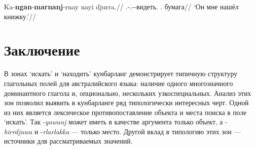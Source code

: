 \begingl
\gla Ka-\textbf{ngan}-\textbf{marnanj}-rnay nayi djurra.//
\glb \Tsg.\Real-\Fsg.\Obj-\Ben-видеть.\Pst{} \Nm.\Cli{} бумага//
\glft `Он мне нашёл книжку.'//%
\endgl\xe


\section{Заключение}
\label{sec:outro}

В зонах `искать' и `находить' кунбарланг демонстрирует типичную структуру глагольных полей для австралийского языка: наличие одного многозначного доминантного глагола и, опционально, нескольких узкоспециальных. Анализ этих зон позволил выявить в кунбарланге ряд типологически интересных черт. Одной из них является лексическое противопоставление объекта и места поиска в поле `искать'. Так -\textit{yawanj} может иметь в качестве аргумента только объект, а -\textit{birrdjuwa} и -\textit{rlarlakka} --- только место. Другой вклад в типологию этих зон --- источники для рассматриваемых значений. 




